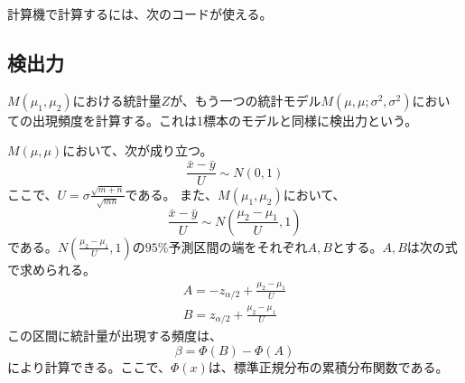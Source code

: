 計算機で計算するには、次のコードが使える。




\begin{comment}
$Z$の不等式を変形していくと、次がわかる
\begin{equation*}
    (\bar{X}-\bar{Y})-z_{0.025}\sigma\sqrt{\frac{1}{n_1}+\frac{1}{n_2}} \leq \mu_2-\mu_1 \leq (\bar{X}-\bar{Y})+z_{0.025}\sigma\sqrt{\frac{1}{n_1}+\frac{1}{n_2}}.
\end{equation*}
この式の意味は、何だっけ？？？TODO
\end{comment}


\subsection{検出力}
$M(\mu_1,\mu_2)$における統計量$Z$が、もう一つの統計モデル$M(\mu,\mu;\sigma^2,\sigma^2)$においての出現頻度を計算する。これは1標本のモデルと同様に検出力という。

$M(\mu,\mu)$において、次が成り立つ。
\begin{equation*}
    \frac{\bar{x}-\bar{y}}{U} \sim N(0,1)
\end{equation*}
ここで、$U=\sigma\frac{\sqrt{m+n}}{\sqrt{mn}}$である。
また、$M(\mu_1,\mu_2)$において、
\begin{equation*}
    \frac{\bar{x}-\bar{y}}{U}\sim N\left(\frac{\mu_2-\mu_1}{U},1\right)
\end{equation*}
である。$N(\frac{\mu_2-\mu_1}{U},1)$の$95\%$予測区間の端をそれぞれ$A,B$とする。$A,B$は次の式で求められる。
\begin{eqnarray*}
    A = -z_{\alpha/2}+\frac{\mu_2-\mu_1}{U}\\
    B = z_{\alpha/2}+\frac{\mu_2-\mu_1}{U}
\end{eqnarray*}
この区間に統計量が出現する頻度は、
\begin{equation*}
    \beta = \varPhi(B)-\varPhi(A)
\end{equation*}
により計算できる。ここで、$\varPhi(x)$は、標準正規分布の累積分布関数である。



